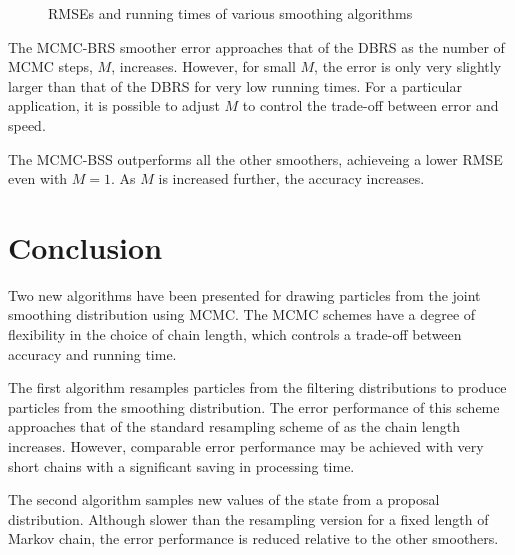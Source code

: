 \documentclass[journal]{IEEEtran}
\begin{document}
\begin{figure}%
\caption{RMSEs and running times of various smoothing algorithms}%
\label{fig:case2_rmse_vs_time}%
\end{figure}

The MCMC-BRS smoother error approaches that of the DBRS as the number of MCMC steps, $M$, increases. However, for small $M$, the error is only very slightly larger than that of the DBRS for very low running times. For a particular application, it is possible to adjust $M$ to control the trade-off between error and speed.

The MCMC-BSS outperforms all the other smoothers, achieveing a lower RMSE even with $M=1$. As $M$ is increased further, the accuracy increases.



\section{Conclusion} \label{sec:conclusions}
Two new algorithms have been presented for drawing particles from the joint smoothing distribution using MCMC. The MCMC schemes have a degree of flexibility in the choice of chain length, which controls a trade-off between accuracy and running time.

The first algorithm resamples particles from the filtering distributions to produce particles from the smoothing distribution. The error performance of this scheme approaches that of the standard resampling scheme of \cite{Godsill2004} as the chain length increases. However, comparable error performance may be achieved with very short chains with a significant saving in processing time.

The second algorithm samples new values of the state from a proposal distribution. Although slower than the resampling version for a fixed length of Markov chain, the error performance is reduced relative to the other smoothers.





%
%
\end{document}

